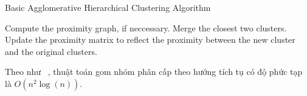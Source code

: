 \begin{algorithm}
\caption{Basic Agglomerative Hierarchical Clustering Algorithm}\label{agl:agglomerative}
\begin{algorithmic}[1]
\State Compute the proximity graph, if neccessary.
\Repeat
\State Merge the closest two clusters.
\State Update the proximity matrix to reflect the proximity between the new cluster and the original clusters.
\end{algorithmic}
\end{algorithm}

Theo như ~\cite{wiki-HAC}, thuật toán gom nhóm phân cấp theo hướng tích tụ có độ phức tạp là $O(n^2\log(n))$.

		
%		

